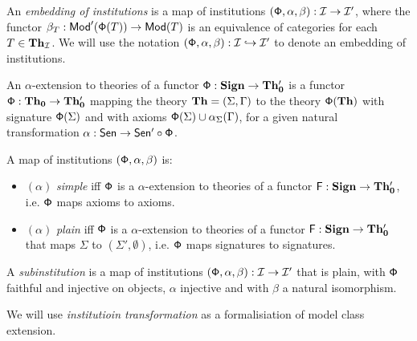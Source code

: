 \documentclass[10pt]{article}
\begin{document}
%
\begin{definition}
An {\it embedding of institutions} \cite{member} is a map of institutions
$({\sf {\Phi}},\alpha,\beta): {\mathcal{I}} \to {\mathcal{I'}}$, where the functor $\beta_T
:{\sf {Mod}}'({\sf {\Phi}}(T)) \to {\sf {Mod}}(T)$ is an equivalence of categories for each $T \in
{\bf Th_{{\mathcal{I}}}}$. We will use the notation $({\sf {\Phi}}, \alpha,\beta):{\mathcal{I}}
\hookrightarrow {\mathcal{I'}}$ to denote an embedding of institutions.
\end{definition}
%
An $\alpha$-extension to theories of a functor ${\sf {\Phi}}:{\bf Sign} \to
{\bf Th_0'}$ is a functor ${\sf {\Phi}}:{\bf Th_0} \to {\bf Th_0'}$ mapping the
theory ${\bf Th}=(\Sigma,\Gamma)$ to the theory ${\sf {\Phi}}({\bf Th})$ with
signature ${\sf {\Phi}}(\Sigma)$ and with axioms ${\sf {\Phi}}(\Sigma) \cup
\alpha_{\Sigma}(\Gamma)$, for a given natural transformation $\alpha:{\sf {Sen}}
\to {\sf {Sen'}} \circ {\sf {\Phi}}$.

\begin{definition} A map of institutions $({\sf {\Phi}},\alpha,\beta)$ is:
	\begin{itemize}
		\item  $(\alpha)$ {\em simple} iff ${\sf {\Phi}}$ is a $\alpha$-extension to theories of a functor ${\sf {F}}:{\bf Sign} \to {\bf Th_0'}$, i.e. ${\sf {\Phi}}$ maps axioms to axioms.
		\item $(\alpha)$ {\em plain} iff ${\sf {\Phi}}$ is a $\alpha$-extension to theories of a functor ${\sf {F}}:{\bf Sign} \to {\bf Th_0'}$ that maps $\Sigma$ to $(\Sigma',\emptyset)$, i.e. ${\sf {\Phi}}$ maps signatures to signatures.
	\end{itemize}
\end{definition}

\begin{definition}
A {\it subinstitution} \cite{general} is a map of institutions
$({\sf {\Phi}},\alpha,\beta):{\mathcal{I}} \to {\mathcal{I}}'$ that is plain, with ${\sf {\Phi}}$
faithful and injective on objects, $\alpha$ injective and with $\beta$ a
natural isomorphism.
\end{definition}
We will use {\it institutioin transformation}\cite{system} as a formalisiation of model class extension.
\end{document}
